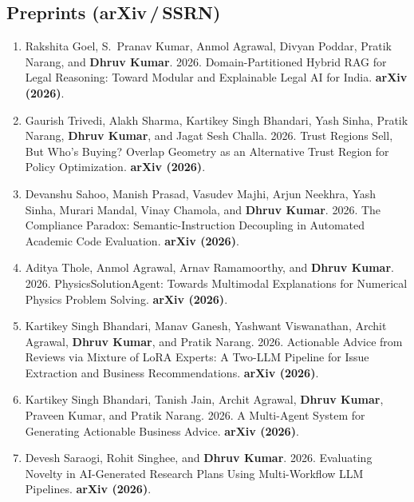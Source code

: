 \documentclass[10pt, a4paper]{article}
\begin{document}
\subsection*{Preprints (arXiv\,/\,SSRN)}
\begin{enumerate}[label=\textbf{P\arabic*.}, leftmargin=2.8em, itemsep=0.3em]

\item Rakshita Goel, S.\ Pranav Kumar, Anmol Agrawal, Divyan Poddar, Pratik Narang, and \textbf{Dhruv Kumar}. 2026. Domain-Partitioned Hybrid RAG for Legal Reasoning: Toward Modular and Explainable Legal AI for India. \textbf{arXiv (2026)}.

\item Gaurish Trivedi, Alakh Sharma, Kartikey Singh Bhandari, Yash Sinha, Pratik Narang, \textbf{Dhruv Kumar}, and Jagat Sesh Challa. 2026. Trust Regions Sell, But Who's Buying? Overlap Geometry as an Alternative Trust Region for Policy Optimization. \textbf{arXiv (2026)}.

\item Devanshu Sahoo, Manish Prasad, Vasudev Majhi, Arjun Neekhra, Yash Sinha, Murari Mandal, Vinay Chamola, and \textbf{Dhruv Kumar}. 2026. The Compliance Paradox: Semantic-Instruction Decoupling in Automated Academic Code Evaluation. \textbf{arXiv (2026)}.

\item Aditya Thole, Anmol Agrawal, Arnav Ramamoorthy, and \textbf{Dhruv Kumar}. 2026. PhysicsSolutionAgent: Towards Multimodal Explanations for Numerical Physics Problem Solving. \textbf{arXiv (2026)}.

\item Kartikey Singh Bhandari, Manav Ganesh, Yashwant Viswanathan, Archit Agrawal, \textbf{Dhruv Kumar}, and Pratik Narang. 2026. Actionable Advice from Reviews via Mixture of LoRA Experts: A Two-LLM Pipeline for Issue Extraction and Business Recommendations. \textbf{arXiv (2026)}.

\item Kartikey Singh Bhandari, Tanish Jain, Archit Agrawal, \textbf{Dhruv Kumar}, Praveen Kumar, and Pratik Narang. 2026. A Multi-Agent System for Generating Actionable Business Advice. \textbf{arXiv (2026)}.

\item Devesh Saraogi, Rohit Singhee, and \textbf{Dhruv Kumar}. 2026. Evaluating Novelty in AI-Generated Research Plans Using Multi-Workflow LLM Pipelines. \textbf{arXiv (2026)}.


\end{enumerate}
\end{document}
